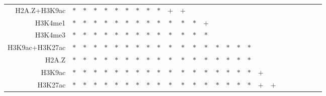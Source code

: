 \documentclass{bioinfo}
\begin{document}
\begin{table}[t]
\begin{center}
\begin{tabular}{ rccccccccccccccccccccccccc }
    H2A.Z+H3K9ac & $*$ & $*$ & $*$ & $*$ & $*$ & $*$ & $*$ & $*$ & $*$ & $+$ & $+$ &     &     &     &     &     &     &     &     &     &     &     &     &     &     \\
    H3K4me1 & $*$ & $*$ & $*$ & $*$ & $*$ & $*$ & $*$ & $*$ & $*$ & $*$ & $*$ & $*$ & $+$ &     &     &     &     &     &     &     &     &     &     &     &     \\
    H3K4me3 & $*$ & $*$ & $*$ & $*$ & $*$ & $*$ & $*$ & $*$ & $*$ & $*$ & $*$ & $*$ & $*$ &     &     &     &     &     &     &     &     &     &     &     &     \\
    H3K9ac+H3K27ac & $*$ & $*$ & $*$ & $*$ & $*$ & $*$ & $*$ & $*$ & $*$ & $*$ & $*$ & $*$ & $*$ & $*$ & $*$ & $*$ & $*$ &     &     &     &     &     &     &     &     \\
    H2A.Z & $*$ & $*$ & $*$ & $*$ & $*$ & $*$ & $*$ & $*$ & $*$ & $*$ & $*$ & $*$ & $*$ & $*$ & $*$ & $*$ & $*$ &     &     &     &     &     &     &     &     \\
    H3K9ac & $*$ & $*$ & $*$ & $*$ & $*$ & $*$ & $*$ & $*$ & $*$ & $*$ & $*$ & $*$ & $*$ & $*$ & $*$ & $*$ & $*$ & $+$ &     &     &     &     &     &     &     \\
    H3K27ac & $*$ & $*$ & $*$ & $*$ & $*$ & $*$ & $*$ & $*$ & $*$ & $*$ & $*$ & $*$ & $*$ & $*$ & $*$ & $*$ & $*$ & $+$ & $+$ &     &     &     &     &     &     \\
    \hline
  \end{tabular}
\end{center}
\vspace{0.0cm}
\end{table}
\end{document}
